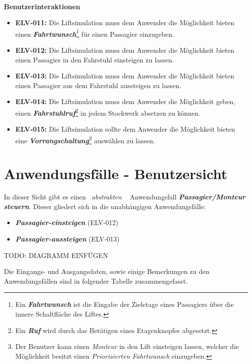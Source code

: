 \paragraph{}
\textbf{Benutzerinteraktionen}
\begin{itemize}
	\item \textbf{ELV-011:}
		Die Liftsimulation muss dem Anwender die Möglichkeit bieten einen \textbf{\textit{Fahrtwunsch}}\footnote{Ein 						\textbf{\textit{Fahrtwunsch}} ist die Eingabe der Zieletage eines Passagiers über die innere Schaltfläche des Liftes.} für einen Passagier 		einzugeben.
	\item \textbf{ELV-012:}
		Die Liftsimulation muss dem Anwender die Möglichkeit bieten einen Passagier in den Fahrstuhl einsteigen zu lassen.
	\item \textbf{ELV-013:}
		Die Liftsimulation muss dem Anwender die Möglichkeit bieten einen Passagier aus dem Fahrstuhl aussteigen zu lassen.
	\item \textbf{ELV-014:}
		Die Liftsimulation muss dem Anwender die Möglichkeit geben, einen \textbf{\textit{Fahrstuhlruf}}\footnote{Ein \textbf{\textit{Ruf}} 		wird durch das Betätigen eines Etagenknopfes abgesetzt.} in jedem Stockwerk absetzen zu können.
	\item \textbf{ELV-015:}
		Die Liftsimulation sollte dem Anwender die Möglichkeit bieten eine \textbf{\textit{Vorrangschaltung}}\footnote{Der Benutzer kann einen 		\textit{Monteur} in den Lift einsteigen lassen, welcher die Möglichkeit besitzt einen \textit{Priorisierten Fahrtwunsch} einzugeben.} 			auswählen zu lassen.
\end{itemize}

\newpage
\section{Anwendungsfälle - Benutzersicht}
In dieser Sicht gibt es einen \textit{\guillemotleft \ abstrakten \ \guillemotright} Anwendungsfall \textit{\textbf{Passagier/Monteur steuern}}. Dieser gliedert sich in die unabhängigen Anwendungsfälle:

\begin{itemize}
	\item \textit{\textbf{Passagier-einsteigen}} (ELV-012)
	\item \textit{\textbf{Passagier-aussteigen}} (ELV-013)
\end{itemize}

TODO: DIAGRAMM EINFÜGEN

Die Eingangs- und Ausgangsdaten, sowie einige Bemerkungen zu den Anwendungsfällen sind in folgender Tabelle zusammengefasst.

